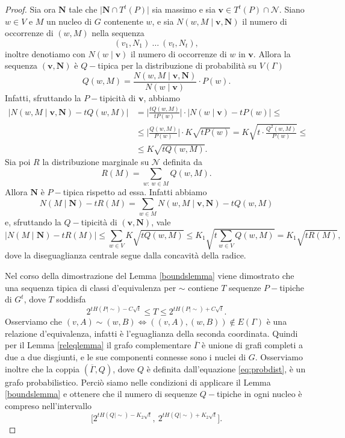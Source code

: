 \begin{proof}
	Sia ora \(\mathbf{N}\) tale che \(\big\vert \mathbf{N}\cap T^t(P) \big\vert\) sia massimo e sia \(\mathbf{v}\in T^t(P)\cap \mathcal{N}\). Siano \(w\in V\) e \(M\) un nucleo di \(G\) contenente \(w\), e sia \(N(w,M\mid \mathbf{v}, \mathbf{N})\) il numero di occorrenze di \((w,M)\) nella sequenza
	\[(v_1, N_1)\ \dots\ (v_t, N_t),\]
	inoltre denotiamo con \(N(w\mid \mathbf{v})\) il numero di occorrenze di \(w\) in \(\mathbf{v}\). Allora la sequenza \((\mathbf{v}, \mathbf{N})\) è \(Q-\)tipica per la distribuzione di probabilità su \(V(\Gamma)\) 
	\begin{equation}
		\label{eq:probdist} Q(w,M)=\frac{N(w,M\mid \mathbf{v}, \mathbf{N})}{N(w\mid \mathbf{v})}\cdot P(w). 
	\end{equation}
	Infatti, sfruttando la \(P-\)tipicità di \(\mathbf{v}\), abbiamo 
	\begin{align}
		\big\vert N(w,M\mid \mathbf{v}, \mathbf{N}) - tQ(w,M)\big\vert &= \bigg\vert \frac{tQ(w,M)}{tP(w)}\bigg\vert \cdot \big\vert N(w\mid \mathbf{v}) - tP(w)\big\vert \le \nonumber \\
		&\le \bigg\vert \frac{Q(w,M)}{P(w)}\bigg\vert \cdot K\sqrt{tP(w)} = K\sqrt{t\cdot\frac{Q^{2}(w,M)}{P(w)}} \le \nonumber \\
		&\le K\sqrt{tQ(w,M)}. \nonumber 
	\end{align}
	Sia poi \(R\) la distribuzione marginale su \(\mathcal{N}\) definita da
	\[R(M)=\sum_{w:\ w\in M} Q(w,M).\]
	Allora \(\mathbf{N}\) è \(P-\)tipica rispetto ad essa. Infatti abbiamo
	\[N(M\mid \mathbf{N})-tR(M)=\sum_{w\in M} N(w,M\mid \mathbf{v},\mathbf{N})-tQ(w,M)\]
	e, sfruttando la \(Q-\)tipicità di \((\mathbf{v}, \mathbf{N})\), vale
	\[\big\vert N(M\mid \mathbf{N})-tR(M) \big\vert\le \sum_{w\in V} K\sqrt{tQ(w,M)}\le K_{1}\sqrt{t\sum_{w\in V} Q(w,M)}=K_{1}\sqrt{tR(M)},\]
	dove la diseguaglianza centrale segue dalla concavità della radice.
	
	Nel corso della dimostrazione del Lemma \ref{boundslemma} viene dimostrato che una sequenza tipica di classi d'equivalenza per \(\sim\) contiene \(T\) sequenze \(P-\)tipiche di \(G^t\), dove \(T\) soddisfa
	\[2^{tH(P\mid\sim)-C\sqrt{t}}\le T\le 2^{tH(P\mid\sim)+C\sqrt{t}}.\]
	Osserviamo che \((v,A)\sim (w,B) \iff ((v,A),(w,B))\not\in E(\Gamma)\) è una relazione d'equivalenza, infatti è l'eguaglianza della seconda coordinata. Quindi per il Lemma \ref{releqlemma} il grafo complementare \(\overline{\Gamma}\) è unione di grafi completi a due a due disgiunti, e le sue componenti connesse sono i nuclei di \(G\). Osserviamo inoltre che la coppia \((\overline{\Gamma}, Q)\), dove \(Q\) è definita dall'equazione \eqref{eq:probdist}, è un grafo probabilistico. Perciò siamo nelle condizioni di applicare il Lemma \ref{boundslemma} e ottenere che il numero di sequenze \(Q-\)tipiche in ogni nucleo è compreso nell'intervallo 
	\begin{equation}
		\label{eq:bounds} \Big[2^{tH(Q\mid\sim)-K_{2}\sqrt{t}},\ 2^{tH(Q\mid\sim)+K_{2}\sqrt{t}}\Big]. 
	\end{equation}
	

\end{proof}
